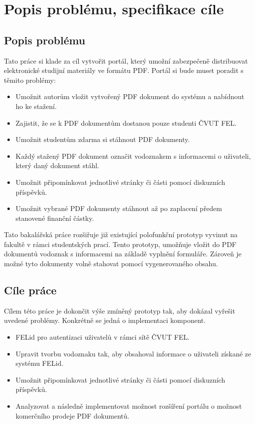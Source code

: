\chapter{Popis problému, specifikace cíle}

\section{Popis problému}
Tato práce si klade za cíl vytvořit portál, který umožní zabezpečeně distribuovat elektronické studijní materiály ve formátu PDF. Portál si bude muset poradit s těmito problémy:

\begin{itemize}
    \item Umožnit autorům vložit vytvořený PDF dokument do systému a nabídnout ho ke stažení.
    \item Zajistit, že se k PDF dokumentům dostanou pouze studenti ČVUT FEL.
    \item Umožnit studentům zdarma si stáhnout PDF dokumenty.
    \item Každý stažený PDF dokument označit vodoznakem s informacemi o uživateli, který daný dokument stáhl.
    \item Umožnit připomínkovat jednotlivé stránky či části pomocí diskuzních příspěvků. 
    \item Umožnit vybrané PDF dokumenty stáhnout až po zaplacení předem stanovené finanční částky.
\end{itemize}

Tato bakalářská práce rozšiřuje již existující polofunkční prototyp vyvinut na fakultě v rámci studentských prací. Tento prototyp, umožňuje vložit do PDF dokumentů vodoznak s informacemi na základě vyplnění formuláře. Zároveň je možné tyto dokumenty volně stahovat pomocí vygenerovaného obsahu.  


\section{Cíle práce}
Cílem této práce je dokončit výše zmíněný prototyp tak, aby dokázal vyřešit uvedené problémy. Konkrétně se jedná o implementaci komponent.

\begin{itemize}
    \item FELid pro autentizaci uživatelů v rámci sítě ČVUT FEL.
    \item Upravit tvorbu vodoznaku tak, aby obsahoval informace o uživateli získané ze systému FELid\cite{FELID}.
    \item Umožnit připomínkovat jednotlivé stránky či části pomocí diskuzních příspěvků.
    \item Analyzovat a následně implementovat možnost rozšíření portálu o možnost komerčního prodeje PDF dokumentů.
\end{itemize}

